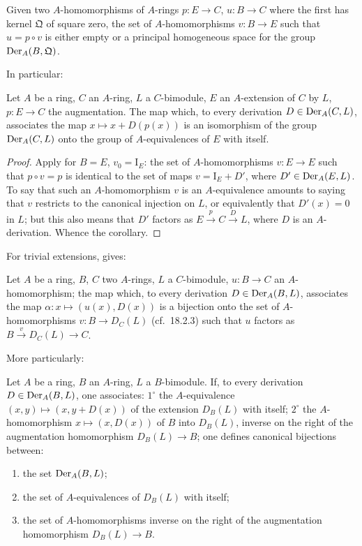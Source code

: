 \begin{corollary}[20.1.3]
\label{0.20.1.3}
Given two $A$-homomorphisms of $A$-rings $p:E\to C$, $u:B\to C$ where the first has kernel $\mathfrak{Q}$ of square zero, the set of $A$-homomorphisms $v:B\to E$ such that $u=p\circ v$ is either empty or a principal homogeneous space for the group $\operatorname{Der}_A(B,\mathfrak{Q})$.
\end{corollary}

In particular:

\begin{corollary}[20.1.4]
\label{0.20.1.4}
Let $A$ be a ring, $C$ an $A$-ring, $L$ a $C$-bimodule, $E$ an $A$-extension of $C$ by $L$, $p:E\to C$ the augmentation.
The map which, to every derivation $D\in\operatorname{Der}_A(C,L)$, associates the map $x\mapsto x+D(p(x))$ is an isomorphism of the group $\operatorname{Der}_A(C,L)$ onto the group of $A$-equivalences of $E$ with itself.
\end{corollary}

\begin{proof}
Apply  for $B=E$, $v_0=\mathrm{I}_E$: the set of $A$-homomorphisms $v:E\to E$ such that $p\circ v=p$ is identical to the set of maps $v=\mathrm{I}_E+D'$, where $D'\in\operatorname{Der}_A(E,L)$.
To say that such an $A$-homomorphism $v$ is an $A$-equivalence amounts to saying that $v$ restricts to the canonical injection on $L$, or equivalently that $D'(x)=0$ in $L$; but this also means that $D'$ factors as $E\xrightarrow{p}C\xrightarrow{D}L$, where $D$ is an $A$-derivation.
Whence the corollary.
\end{proof}

For trivial extensions,  gives:

\begin{corollary}[20.1.5]
\label{0.20.1.5}
Let $A$ be a ring, $B$, $C$ two $A$-rings, $L$ a $C$-bimodule, $u:B\to C$ an $A$-homomorphism; the map which, to every derivation $D\in\operatorname{Der}_A(B,L)$, associates the map $\alpha:x\mapsto(u(x),D(x))$ is a bijection onto the set of $A$-homomorphisms $v:B\to D_C(L)$ \textup{(}cf.\ 18.2.3\textup{)} such that $u$ factors as $B\xrightarrow{v}D_C(L)\to C$.
\end{corollary}

More particularly:

\begin{corollary}[20.1.6]
\label{0.20.1.6}
Let $A$ be a ring, $B$ an $A$-ring, $L$ a $B$-bimodule.
If, to every derivation $D\in\operatorname{Der}_A(B,L)$, one associates: $1^\circ$ the $A$-equivalence $(x,y)\mapsto(x,y+D(x))$ of the extension $D_B(L)$ with itself; $2^\circ$ the $A$-homomorphism $x\mapsto(x,D(x))$ of $B$ into $D_B(L)$, inverse on the right of the augmentation homomorphism $D_B(L)\to B$; one defines canonical bijections between:
\begin{enumerate}
  \item[\rm(i)] the set $\operatorname{Der}_A(B,L)$;
  \item[\rm(ii)] the set of $A$-equivalences of $D_B(L)$ with itself;
  \item[\rm(iii)] the set of $A$-homomorphisms inverse on the right of the augmentation homomorphism $D_B(L)\to B$.
\end{enumerate}
\end{corollary}

